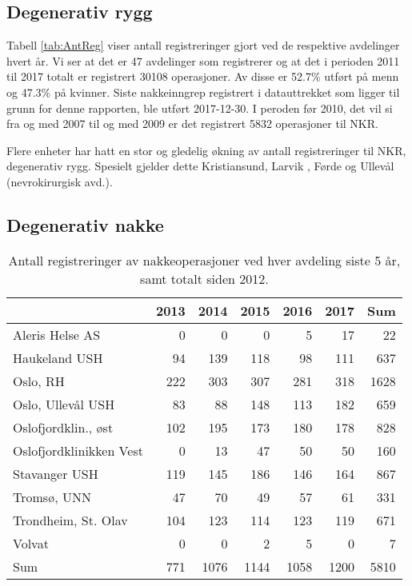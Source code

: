 \documentclass [norsk,a4paper,twoside]{article}\usepackage[]{graphicx}\usepackage[]{color}
\begin{document}
\subsection{Degenerativ rygg}

Tabell \ref{tab:AntReg} viser antall 
registreringer gjort ved de respektive avdelinger hvert år. Vi ser at det er  
47 avdelinger som registrerer og at det i perioden 2011 til 2017 totalt er registrert 30108 
operasjoner. Av disse er 52.7\% utført på menn og 47.3\% på kvinner.
Siste nakkeinngrep registrert i datauttrekket som ligger til grunn for denne rapporten, ble utført 
2017-12-30. I peroden før 2010, det vil si fra og med 2007 til og med 2009 er det 
registrert 5832 operasjoner til NKR. 
\par

Flere enheter har hatt en stor og gledelig økning av antall registreringer til NKR, degenerativ rygg. Spesielt gjelder dette Kristiansund, Larvik , Førde og Ullevål (nevrokirurgisk avd.).


\subsection{Degenerativ nakke}

\begin{table}[ht]
\centering
\begin{tabular}{lrrrrrr}
  \hline
 & 2013 & 2014 & 2015 & 2016 & 2017 & Sum \\ 
  \hline
Aleris Helse AS & 0 & 0 & 0 & 5 & 17 & 22 \\ 
  Haukeland USH & 94 & 139 & 118 & 98 & 111 & 637 \\ 
  Oslo, RH & 222 & 303 & 307 & 281 & 318 & 1628 \\ 
  Oslo, Ullevål USH & 83 & 88 & 148 & 113 & 182 & 659 \\ 
  Oslofjordklin., øst & 102 & 195 & 173 & 180 & 178 & 828 \\ 
  Oslofjordklinikken Vest & 0 & 13 & 47 & 50 & 50 & 160 \\ 
  Stavanger USH & 119 & 145 & 186 & 146 & 164 & 867 \\ 
  Tromsø, UNN & 47 & 70 & 49 & 57 & 61 & 331 \\ 
  Trondheim, St. Olav & 104 & 123 & 114 & 123 & 119 & 671 \\ 
  Volvat & 0 & 0 & 2 & 5 & 0 & 7 \\ 
  Sum & 771 & 1076 & 1144 & 1058 & 1200 & 5810 \\ 
   \hline
\end{tabular}
\caption{Antall registreringer av nakkeoperasjoner ved hver avdeling siste 5 år, samt totalt siden 2012.} 
\label{tab:AntRegNakke}
\end{table}
\end{document}
